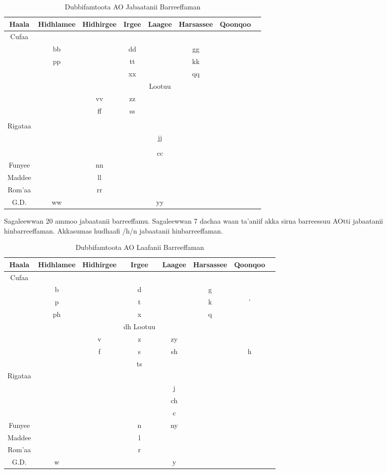 \documentclass[11pt,b5paper]{book}
\begin{document}
\begin{table}[H]
	\centering
	\caption{Dubbifamtoota AO Jabaatanii Barreeffaman}
	\begin{tabular}{c |c c c c c c c}
		\hline
		Haala & Hidhlamee & Hidhirgee & Irgee & Laagee & Harsassee & Qoonqoo \\
		\hline
		Cufaa \\
		 & bb & & dd & & gg & & \\
		 & pp & & tt & & kk & & \\
		 & & & xx & & qq & & \\
		 & & & &\cr
		\hline
		Lootuu \\
		 & & vv & zz & & \\
		 &  & ff & ss & & & &  \\
		 & & & &\\
		\hline
		Rigataa \\
		 & & & & jj \\
		 & & & & &\\
		 & & & & cc\\
		\hline
		Funyee & & nn \\
		\hline
		Maddee & & ll\\
		\hline
		Rom'aa & & rr\\
		\hline
		G.D. & ww & & & yy\\
		\hline		
	\end{tabular}
\end{table}

Sagaleewwan 20 ammoo jabaatanii barreeffamu. Sagaleewwan 7 dachaa waan ta'aniif akka sirna barreessuu AOtti jabaatanii hinbarreeffaman. Akkasumas hudhaafi /h/n jabaatanii hinbarreeffaman.

\begin{table}[H]	
	\caption{Dubbifamtoota AO Laafanii Barreeffaman}
	\begin{tabular}{c c c c c c c c}
		\hline
		Haala & Hidhlamee & Hidhirgee & Irgee & Laagee & Harsassee & Qoonqoo \\
		\hline
		Cufaa \\
		 & b & & d & & g & & \\
		 & p & & t & & k & ' \\
		 & ph & & x & & q & & \\
		 & & & dh\cr
		\hline
		Lootuu \\
		 & & v & z & zy \\
		 &  & f & s & sh & & h\\
		 & & & ts\\
		\hline
		Rigataa \\
		 & & & & j \\
		 & & & & ch\\
		 & & & & c\\
		\hline
		Funyee & & & n & ny\\
		\hline
		Maddee & & & l\\
		\hline
		Rom'aa & & & r\\
		\hline
		G.D. & w & & & y\\
		\hline		
	\end{tabular}
\end{table}
\end{document}
